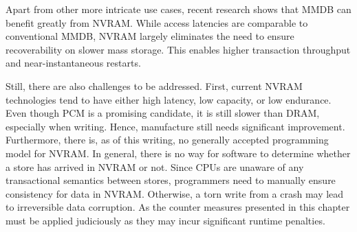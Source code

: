 Apart from other more intricate use cases, recent research shows that MMDB can
benefit greatly from NVRAM. While access latencies are comparable to
conventional MMDB, NVRAM largely eliminates the need to ensure recoverability on
slower mass storage. This enables higher transaction throughput and
near-instantaneous restarts.

Still, there are also challenges to be addressed. First, current NVRAM
technologies tend to have either high latency, low capacity, or low endurance.
Even though PCM is a promising candidate, it is still slower than DRAM,
especially when writing. Hence, manufacture still needs significant improvement.
Furthermore, there is, as of this writing, no generally accepted programming
model for NVRAM. In general, there is no way for software to determine whether a
store has arrived in NVRAM or not. Since CPUs are unaware of any transactional
semantics between stores, programmers need to manually ensure consistency for
data in NVRAM. Otherwise, a torn write from a crash may lead to irreversible
data corruption. As the counter measures presented in this chapter must be
applied judiciously as they may incur significant runtime penalties.
